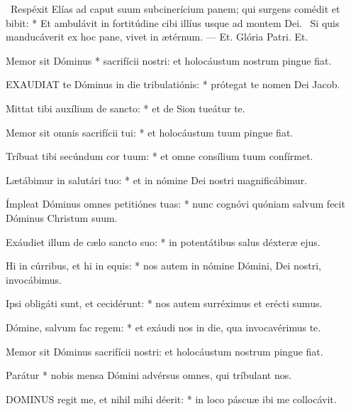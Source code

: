 \R\ Respéxit Elías ad caput suum subcinerícium panem; qui surgens comédit et bibit: * Et ambulávit in fortitúdine cibi illíus usque ad montem Dei. \V\ Si quis manducáverit ex hoc pane, vivet in ætérnum. --- Et. Glória Patri. Et.


 Memor sit Dóminus * sacrifícii nostri: et holocáustum nostrum pingue fiat.


\lettrine[lines=2]{E}{XAUDIAT} te Dóminus in die tribulatiónis: * prótegat te nomen Dei Jacob.

Mittat tibi auxílium de sancto: * et de Sion tueátur te.

Memor sit omnis sacrifícii tui: * et holocáustum tuum pingue fiat.

Tríbuat tibi secúndum cor tuum: * et omne consílium tuum confírmet.

Lætábimur in salutári tuo: * et in nómine Dei nostri magnificábimur.

Ímpleat Dóminus omnes petitiónes tuas: * nunc cognóvi quóniam salvum fecit Dóminus Christum suum.

Exáudiet illum de cælo sancto suo: * in potentátibus salus déxteræ ejus.

Hi in cúrribus, et hi in equis: * nos autem in nómine Dómini, Dei nostri, invocábimus.

Ipsi obligáti sunt, et cecidérunt: * nos autem surréximus et erécti sumus.

Dómine, salvum fac regem: * et exáudi nos in die, qua invocavérimus te.

 Memor sit Dóminus sacrifícii nostri: et holocáustum nostrum pingue fiat.

 Parátur * nobis mensa Dómini advérsus omnes, qui tríbulant nos.


\lettrine[lines=2]{D}{OMINUS} regit me, et nihil mihi déerit: * in loco páscuæ ibi me collocávit.

